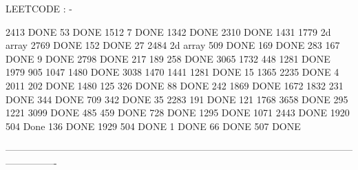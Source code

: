 LEETCODE : -

2413             DONE                       53        DONE                       1512                           7      DONE
1342             DONE                       2310      DONE                       1431                          1779    2d array        
2769             DONE                       152       DONE                       27                            2484     2d array
509              DONE                       169       DONE                       283                           167      DONE
9                DONE                       2798      DONE                       217                           189
258              DONE                       3065                                 1732                          448
1281             DONE                       1979                                 905                           1047
1480             DONE                       3038                                 1470                          1441
1281             DONE                       15                                   1365
2235             DONE                       4                                    2011                 
202              DONE                       1480                                 125
326              DONE                       88        DONE                       242
1869             DONE                       1672                                 1832
231              DONE                       344       DONE                       709
342              DONE                       35                                   2283
191              DONE                       121                                  1768
3658             DONE                       295                                  1221
3099             DONE                       485                                  459         DONE
728              DONE                       1295      DONE                       1071                                                        
2443             DONE                       1920                                 504         Done
136              DONE                       1929                                 504         DONE
1                DONE                       66        DONE                       507         DONE

----------------------------------------------------------------------------------------------------------------------------
